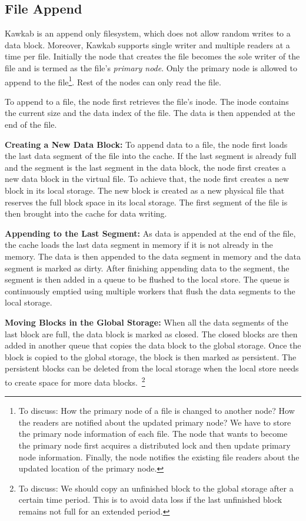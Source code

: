 \documentclass[]{article}
\newcommand{\subtopic}[1]{\vspace{1.5pt} \noindent \textbf{#1}}
\newcommand{\hl}[1]{\textcolor{hlcolor}{#1}}
\begin{document}
\subsection{File Append}

Kawkab is an append only filesystem, which does not allow random writes to
a data block. Moreover, Kawkab supports single writer and multiple readers at 
a time per file.
Initially the node that creates the file becomes the sole writer of the file
and is termed as the file's \textit{primary node}. Only the primary node is
allowed to append to the file\footnote{ 
\hl{To discuss: How the primary node of a file is changed to another node? 
How the readers are notified about the updated primary node? 
We have to store the primary node information of each file. The
node that wants to become the primary node first acquires a
distributed lock and then update primary node information. Finally, the node
notifies the existing file readers about the updated location of the
primary node.}}.  Rest of the nodes can only read the file.

To append to a file, the node first retrieves the file's inode. The
inode contains the current size and the data index of the file. The
data is then appended at the end of the file.

\subtopic{Creating a New Data Block:} To append data to a file, the node first 
loads the last data segment of the file into the cache.  If the last segment is already
full and the segment is the last segment in the data block, the node first
creates a new data block in the virtual file.%
To achieve that, the node first creates a new block in its local storage.  The new
block is created as a new physical file that reserves the full
block space in its local storage. The first segment of the file is then brought
into the cache for data writing.

\subtopic{Appending to the Last Segment:} As data is appended at the end of the
file, the cache loads the last data segment in memory if it is not
already in the memory.  The data is then appended to the data segment in memory
and the data segment is marked as dirty. After finishing appending data to the
segment, the segment is then added in a queue to be flushed to the local store. 
The queue is continuously emptied using multiple workers that flush the data 
segments to the local storage.

\subtopic{Moving Blocks in the Global Storage:}
When all the data segments of the last block are full, the data block is marked
as closed. The closed blocks are then added in another queue that copies
the data block to the global storage. Once the block is copied to the global
storage, the block is then marked as persistent. The persistent blocks
can be deleted from the local storage when the local store needs to create
space for more data blocks.~\footnote{\hl{To discuss: We should copy an unfinished
block to the global storage after a certain time period. This is to avoid data
loss if the last unfinished block remains not full for an extended period.}}
\end{document}
